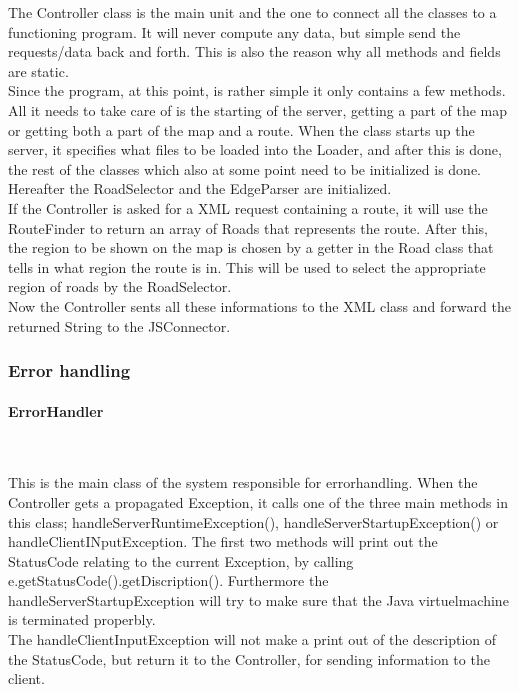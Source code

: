\documentclass[a4paper,10pt,titlepage]{article}
\begin{document}
The Controller class is the main unit and the one to connect all the classes to a functioning program. It will never compute any data, but simple send the requests/data back and forth.  This is also the reason why all methods and fields are static.\\
Since the program, at this point, is rather simple it only contains a few methods. All it needs to take care of is the starting of the server, getting a part of the map or getting both a part of the map and a route. When the class starts up the server, it specifies what files to be loaded into the Loader, and after this is done, the rest of the classes which also at some point need to be initialized is done. Hereafter the RoadSelector and the EdgeParser are initialized.\\
If the Controller is asked for a XML request containing a route, it will use the RouteFinder to return an array of Roads that represents the route. After this, the region to be shown on the map is chosen by a getter in the Road class that tells in what region the route is in. This will be used to select the appropriate region of roads by the RoadSelector.\\
Now the Controller sents all these informations to the XML class and forward the returned String to the JSConnector.\\


					
			\subsubsection{Error handling}
				
				\paragraph{ErrorHandler}\mbox{}\

This is the main class of the system responsible for errorhandling. When the Controller gets a propagated Exception, it calls one of the three main methods in this class; handleServerRuntimeException(), handleServerStartupException() or handleClientINputException. The first two methods will print out the StatusCode relating to the current Exception, by calling e.getStatusCode().getDiscription(). Furthermore the handleServerStartupException will try to make sure that the Java virtuelmachine is terminated properbly.\\
The handleClientInputException will not make a print out of the description of the StatusCode, but return it to the Controller, for sending information to the client.
\end{document}
